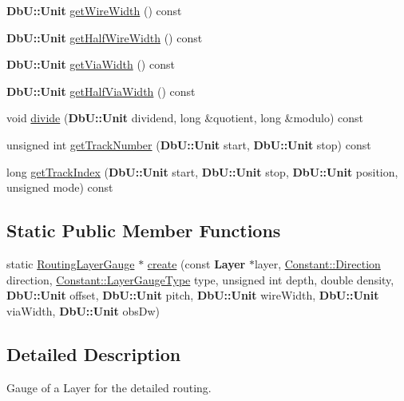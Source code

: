 \begin{DoxyCompactItemize}
{\bf Db\-U\-::\-Unit} \hyperlink{classCRL_1_1RoutingLayerGauge_af8d0766b3741ef041bb40805e9ade562}{get\-Wire\-Width} () const 
\item 
{\bf Db\-U\-::\-Unit} \hyperlink{classCRL_1_1RoutingLayerGauge_aca47ad42af7852a7a30d7b470b43f290}{get\-Half\-Wire\-Width} () const 
\item 
{\bf Db\-U\-::\-Unit} \hyperlink{classCRL_1_1RoutingLayerGauge_a5fbf1913fb9198f8a56c969c9fec983f}{get\-Via\-Width} () const 
\item 
{\bf Db\-U\-::\-Unit} \hyperlink{classCRL_1_1RoutingLayerGauge_a74ee6aee07965ed8ef80ccf12f6d4984}{get\-Half\-Via\-Width} () const 
\item 
void \hyperlink{classCRL_1_1RoutingLayerGauge_a2a2231bbb064fe316977291df7ef016c}{divide} ({\bf Db\-U\-::\-Unit} dividend, long \&quotient, long \&modulo) const 
\item 
unsigned int \hyperlink{classCRL_1_1RoutingLayerGauge_ab9a7e3219b19617f91cd89c6e7eeaee2}{get\-Track\-Number} ({\bf Db\-U\-::\-Unit} start, {\bf Db\-U\-::\-Unit} stop) const 
\item 
long \hyperlink{classCRL_1_1RoutingLayerGauge_a4e51ea096d791f11949d8c732d8372ae}{get\-Track\-Index} ({\bf Db\-U\-::\-Unit} start, {\bf Db\-U\-::\-Unit} stop, {\bf Db\-U\-::\-Unit} position, unsigned mode) const 
\end{DoxyCompactItemize}
\subsection*{Static Public Member Functions}
\begin{DoxyCompactItemize}
\item 
static \hyperlink{classCRL_1_1RoutingLayerGauge}{Routing\-Layer\-Gauge} $\ast$ \hyperlink{classCRL_1_1RoutingLayerGauge_afe17db013bf6a933c2af4e847bfd7918}{create} (const {\bf Layer} $\ast$layer, \hyperlink{namespaceConstant_ac081a99f2b64361919ed5d9f37c0f9af}{Constant\-::\-Direction} direction, \hyperlink{namespaceConstant_ab2e46a17cc373a268c5c24fa0e2067e5}{Constant\-::\-Layer\-Gauge\-Type} type, unsigned int depth, double density, {\bf Db\-U\-::\-Unit} offset, {\bf Db\-U\-::\-Unit} pitch, {\bf Db\-U\-::\-Unit} wire\-Width, {\bf Db\-U\-::\-Unit} via\-Width, {\bf Db\-U\-::\-Unit} obs\-Dw)
\end{DoxyCompactItemize}


\subsection{Detailed Description}
Gauge of a Layer for the detailed routing. 

